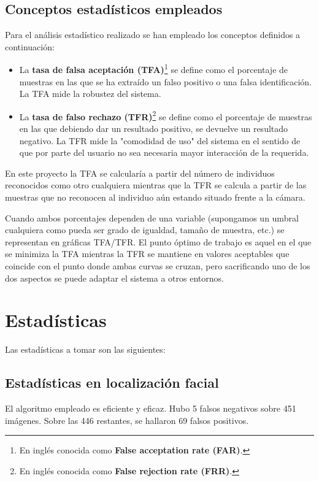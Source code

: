 \subsection{Conceptos estadísticos empleados}
Para el análisis estadístico realizado se han empleado los conceptos definidos a continuación:
\begin{itemize}
	\item{La \textbf{tasa de falsa aceptación (TFA)}\footnote{En inglés conocida como \textbf{False acceptation rate (FAR)}.} se define como el porcentaje de muestras en las que se ha extraído un falso positivo o una falsa identificación. La TFA mide la robustez del sistema.}
	\item{La \textbf{tasa de falso rechazo (TFR)}\footnote{En inglés conocida como \textbf{False rejection rate (FRR)}.} se define como el porcentaje de muestras en las que debiendo dar un resultado positivo, se devuelve un resultado negativo. La TFR mide la "comodidad de uso" del sistema en el sentido de que por parte del usuario no sea necesaria mayor interacción de la requerida. }
\end {itemize}

En este proyecto la TFA se calcularía a partir del número de individuos reconocidos como otro cualquiera mientras que la TFR se calcula a partir de las muestras que no reconocen al individuo aún estando situado frente a la cámara.

Cuando ambos porcentajes dependen de una variable (supongamos un umbral cualquiera como pueda ser grado de igualdad, tamaño de muestra, etc.) se representan en gráficas TFA/TFR. El punto óptimo de trabajo es aquel en el que se minimiza la TFA mientras la TFR se mantiene en valores aceptables que coincide con el punto donde ambas curvas se cruzan, pero sacrificando uno de los dos aspectos se puede adaptar el sistema a otros entornos.

\section{Estadísticas}

Las estadísticas a tomar son las siguientes:

\subsection{Estadísticas en localización facial}
El algoritmo empleado es eficiente y eficaz. Hubo 5 falsos negativos sobre 451 imágenes. Sobre las 446 restantes, se hallaron 69 falsos positivos. 

